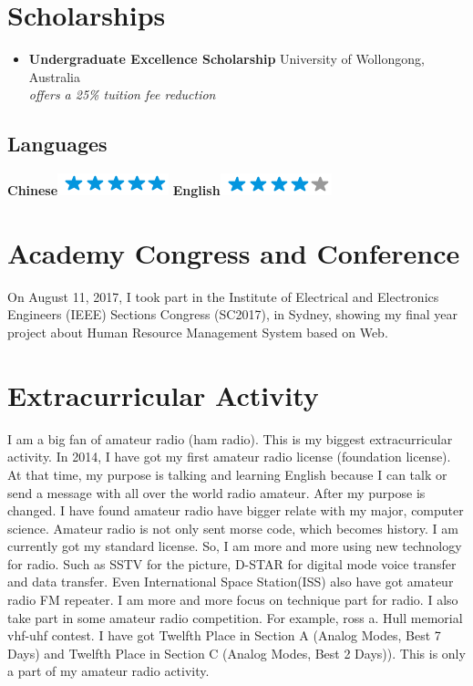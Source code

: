 \documentclass[]{friggeri-cv}
\renewenvironment{entrylist}{%
  \begin{itemize}[leftmargin=1in]%
  }{%
  \end{itemize}
}
\renewcommand{\entry}[4]{%
\item[#1]
  \textbf{#2}%
  \hfill%
  {\footnotesize\addfontfeature{Color=lightgray} #3}\\%
  #4\vspace{\parsep}%
}
\begin{document}
\section{Scholarships}
\begin{entrylist}
  \entry
    {2014}
    {Undergraduate Excellence Scholarship}
    {University of Wollongong, Australia}
    {\emph{offers a 25\% tuition fee reduction}}
\end{entrylist}

\begin{aside}
  \section{Languages}
    \textbf{Chinese}\includegraphics[scale=0.40]{img/5stars.png}
    \textbf{English}\includegraphics[scale=0.40]{img/4stars.png}
\end{aside}

\section{Academy Congress and Conference}
On August 11, 2017, I took part in the Institute of Electrical and Electronics Engineers (IEEE) Sections Congress (SC2017), in Sydney, showing my final year project about Human Resource Management System based on Web.

\section{Extracurricular Activity}
I am a big fan of amateur radio (ham radio).
This is my biggest extracurricular activity.
In 2014, I have got my first amateur radio license (foundation license).
At that time, my purpose is talking and learning English because I can talk or send a message with all over the world radio amateur.
After my purpose is changed. I have found amateur radio have bigger relate with my major, computer science.
Amateur radio is not only sent morse code, which becomes history.
I am currently got my standard license.
So, I am more and more using new technology for radio.
Such as SSTV for the picture, D-STAR for digital mode voice transfer and data transfer.
Even International Space Station(ISS) also have got amateur radio FM repeater.
I am more and more focus on technique part for radio.
I also take part in some amateur radio competition.
For example, ross a. Hull memorial vhf-uhf contest.
I have got Twelfth Place in Section A (Analog Modes, Best 7 Days) and Twelfth Place in Section C (Analog Modes, Best 2 Days)).
This is only a part of my amateur radio activity.
\end{document}
